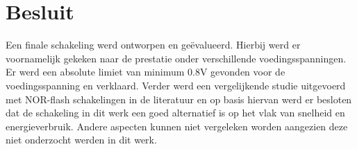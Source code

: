 \section{Besluit}
Een finale schakeling werd ontworpen en geëvalueerd. Hierbij werd er voornamelijk gekeken naar de prestatie onder verschillende voedingsspanningen. Er werd een absolute limiet van minimum 0.8V gevonden voor de voedingsspanning en verklaard. Verder werd een vergelijkende studie uitgevoerd met NOR-flash schakelingen in de literatuur en op basis hiervan werd er besloten dat de schakeling in dit werk een goed alternatief is op het vlak van snelheid en energieverbruik. Andere aspecten kunnen niet vergeleken worden aangezien deze niet onderzocht werden in dit werk.
